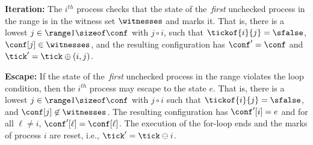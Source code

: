 \noindent\begin{minipage}[!t]{0.7\linewidth}%
  {\bf Iteration:} The $i^{th}$ process checks that the state of
  the~\emph{first} unchecked process in the range is in the witness
  set $\witnesses$ and marks it. %
  That is, there is a lowest $j\in\range 1 {\sizeof \conf}$ with
  $j\circ i$, such that %
  $\tickof{i}{j}=\sfalse$, $\conf [j]\in\witnesses$, and the resulting
  configuration has $\conf'=\conf$ and $\tick'=\tick\oplus(i,j)$.
\end{minipage}
\hfill%
\begin{minipage}[!t]{0.29\linewidth}%
\end{minipage}

\noindent\begin{minipage}[!t]{0.7\linewidth}%
  {\bf Escape:} If the state of the~\emph{first} unchecked process in
  the range violates the loop condition, then the $i^{th}$ process may
  escape to the state $e$. %
  That is, there is a lowest $j\in\range 1 {\sizeof \conf}$ with
  $j\circ i$ such that $\tickof{i}{j}=\sfalse$, and $\conf [j]\not\in
  \witnesses$. %
  The resulting configuration has $\conf' [i] = e$ and for all
  $\ell\neq i$, $\conf' [\ell] = \conf [\ell]$. The execution of the
  for-loop ends and the marks of process $i$ are reset, i.e.,
  $\tick'=\tick\ominus i$.
\end{minipage}
\hfill%
\begin{minipage}[!t]{0.29\linewidth}%
\end{minipage}


